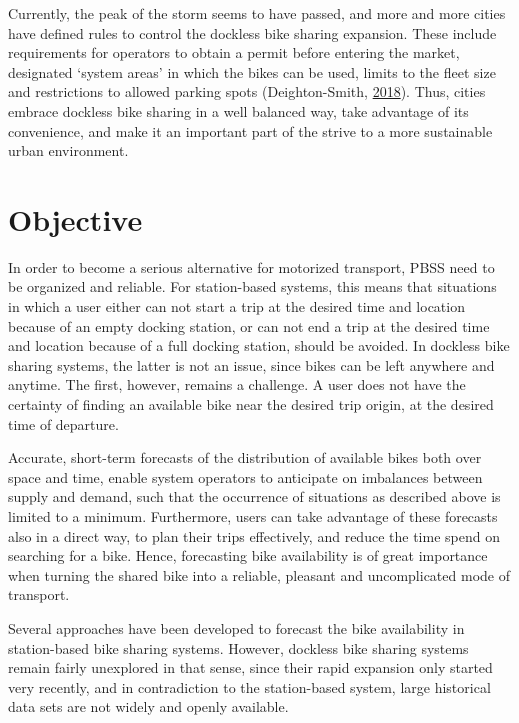 \documentclass[12pt,oneside]{reedthesis}
\begin{document}
Currently, the peak of the storm seems to have passed, and more and more
cities have defined rules to control the dockless bike sharing
expansion. These include requirements for operators to obtain a permit
before entering the market, designated `system areas' in which the bikes
can be used, limits to the fleet size and restrictions to allowed
parking spots (Deighton-Smith, \protect\hyperlink{ref-itf2018}{2018}).
Thus, cities embrace dockless bike sharing in a well balanced way, take
advantage of its convenience, and make it an important part of the
strive to a more sustainable urban environment.

\section{Objective}\label{objective}

In order to become a serious alternative for motorized transport, PBSS
need to be organized and reliable. For station-based systems, this means
that situations in which a user either can not start a trip at the
desired time and location because of an empty docking station, or can
not end a trip at the desired time and location because of a full
docking station, should be avoided. In dockless bike sharing systems,
the latter is not an issue, since bikes can be left anywhere and
anytime. The first, however, remains a challenge. A user does not have
the certainty of finding an available bike near the desired trip origin,
at the desired time of departure.

Accurate, short-term forecasts of the distribution of available bikes
both over space and time, enable system operators to anticipate on
imbalances between supply and demand, such that the occurrence of
situations as described above is limited to a minimum. Furthermore,
users can take advantage of these forecasts also in a direct way, to
plan their trips effectively, and reduce the time spend on searching for
a bike. Hence, forecasting bike availability is of great importance when
turning the shared bike into a reliable, pleasant and uncomplicated mode
of transport.

Several approaches have been developed to forecast the bike availability
in station-based bike sharing systems. However, dockless bike sharing
systems remain fairly unexplored in that sense, since their rapid
expansion only started very recently, and in contradiction to the
station-based system, large historical data sets are not widely and
openly available.
\end{document}
